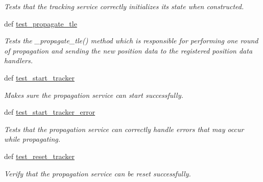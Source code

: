 \begin{DoxyCompactItemize}
\begin{DoxyCompactList}\small\item\em Tests that the tracking service correctly initializes its state when constructed. \end{DoxyCompactList}\item 
def \hyperlink{classhwm_1_1hardware_1_1devices_1_1drivers_1_1sgp4__tracker_1_1tests_1_1test__sgp4__tracker_1_1_test_s_g_p4_tracking_service_af94a5a618cc9466cefa243a17024348e}{test\-\_\-propagate\-\_\-tle}
\begin{DoxyCompactList}\small\item\em Tests the \-\_\-propagate\-\_\-tle() method which is responsible for performing one round of propagation and sending the new position data to the registered position data handlers. \end{DoxyCompactList}\item 
def \hyperlink{classhwm_1_1hardware_1_1devices_1_1drivers_1_1sgp4__tracker_1_1tests_1_1test__sgp4__tracker_1_1_test_s_g_p4_tracking_service_aede83c90044cdcdb9c11522f30f6ea41}{test\-\_\-start\-\_\-tracker}
\begin{DoxyCompactList}\small\item\em Makes sure the propagation service can start successfully. \end{DoxyCompactList}\item 
def \hyperlink{classhwm_1_1hardware_1_1devices_1_1drivers_1_1sgp4__tracker_1_1tests_1_1test__sgp4__tracker_1_1_test_s_g_p4_tracking_service_add4e1cd9af4953acd6b63dcdcb15da71}{test\-\_\-start\-\_\-tracker\-\_\-error}
\begin{DoxyCompactList}\small\item\em Tests that the propagation service can correctly handle errors that may occur while propagating. \end{DoxyCompactList}\item 
def \hyperlink{classhwm_1_1hardware_1_1devices_1_1drivers_1_1sgp4__tracker_1_1tests_1_1test__sgp4__tracker_1_1_test_s_g_p4_tracking_service_aa38b8aea11adbde4ffa2c7ccf12544a9}{test\-\_\-reset\-\_\-tracker}
\begin{DoxyCompactList}\small\item\em Verify that the propagation service can be reset successfully. \end{DoxyCompactList}\end{DoxyCompactItemize}
